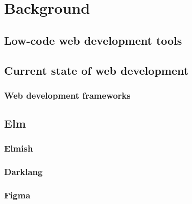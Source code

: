 \chapter{Background}

\section{Low-code web development tools}

\section{Current state of web development}

\subsection{Web development frameworks}
\section{Elm}
\subsection*{Elmish}

\subsection*{Darklang}
\subsection*{Figma}










